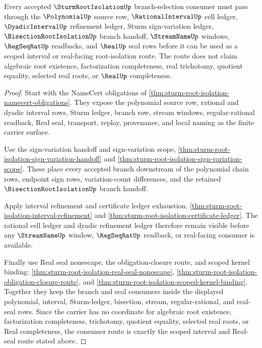 \begin{theorem}
\label{thm:sturm-root-isolation-scoped-interval-real-seal-route}
Every accepted $\SturmRootIsolationUp$ branch-selection consumer must pass
through the $\PolynomialUp$ source row, $\RationalIntervalUp$ cell ledger,
$\DyadicIntervalUp$ refinement ledger, Sturm sign-variation ledger,
$\BisectionRootIsolationUp$ branch handoff, $\StreamNameUp$ windows,
$\RegSeqRatUp$ readbacks, and $\RealUp$ seal rows before it can be used as a
scoped interval or real-facing root-isolation route. The route does not claim
algebraic root existence, factorization completeness, real trichotomy, quotient
equality, selected real roots, or $\RealUp$ completeness.
\end{theorem}
\begin{proof}
Start with the NameCert obligations of
\autoref{thm:sturm-root-isolation-namecert-obligations}. They expose the
polynomial source row, rational and dyadic interval rows, Sturm ledger, branch
row, stream windows, regular-rational readback, Real seal, transport, replay,
provenance, and local naming as the finite carrier surface.

Use the sign-variation handoff and sign-variation scope,
\autoref{thm:sturm-root-isolation-sign-variation-handoff} and
\autoref{thm:sturm-root-isolation-sign-variation-scope}. These place every
accepted branch downstream of the polynomial chain rows, endpoint sign rows,
variation-count differences, and the retained $\BisectionRootIsolationUp$
branch handoff.

Apply interval refinement and certificate ledger exhaustion,
\autoref{thm:sturm-root-isolation-interval-refinement} and
\autoref{thm:sturm-root-isolation-certificate-ledger}. The rational cell ledger
and dyadic refinement ledger therefore remain visible before any
$\StreamNameUp$ window, $\RegSeqRatUp$ readback, or real-facing consumer is
available.

Finally use Real seal nonescape, the obligation-closure route, and scoped
kernel binding:
\autoref{thm:sturm-root-isolation-real-seal-nonescape},
\autoref{thm:sturm-root-isolation-obligation-closure-route}, and
\autoref{thm:sturm-root-isolation-scoped-kernel-binding}. Together they keep
the branch and seal consumers inside the displayed polynomial, interval,
Sturm-ledger, bisection, stream, regular-rational, and real-seal rows. Since
the carrier has no coordinate for algebraic root existence, factorization
completeness, trichotomy, quotient equality, selected real roots, or Real
completeness, the consumer route is exactly the scoped interval and Real-seal
route stated above.
\end{proof}

